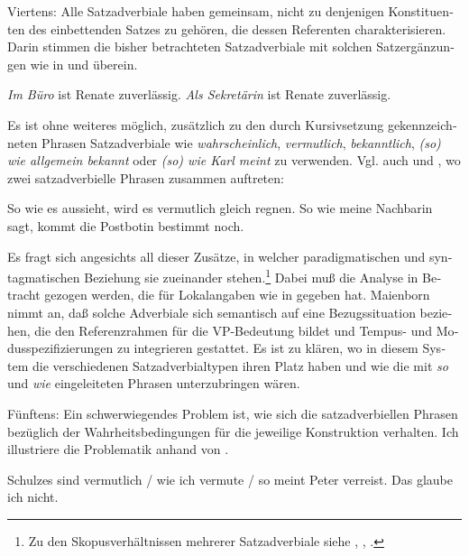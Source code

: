 \documentclass[output=paper, colorlinks, citecolor=brown, booklanguage=german]{langscibook}
\begin{document}
\begin{otherlanguage}{german}
Viertens: Alle Satzadverbiale haben gemeinsam, nicht zu denjenigen Konstituenten des einbettenden Satzes zu gehören, die dessen Referenten charakterisieren. Darin stimmen die bisher betrachteten Satzadverbiale mit solchen Satzergänzungen wie in  und  überein.

\ea \label{ex:zi97:64} %
\textit{Im Büro} ist Renate zuverlässig.
\ex \label{ex:zi97:65} %
\textit{Als Sekretärin} ist Renate zuverlässig.
\z

\noindent Es ist ohne weiteres möglich, zusätzlich zu den durch Kursivsetzung %
gekennzeichneten Phrasen Satzadverbiale wie \textit{wahrscheinlich}, \textit{vermutlich}, \textit{bekanntlich}, \textit{(so) wie allgemein bekannt} oder \textit{(so) wie Karl meint} zu verwenden. Vgl. auch  und , wo zwei satzadverbielle Phrasen zusammen auftreten:

\ea\label{ex:zi97::66} So wie es aussieht, wird es vermutlich gleich regnen.
\ex\label{ex:zi97::67} So wie meine Nachbarin sagt, kommt die Postbotin bestimmt noch.
\z 

\noindent Es fragt sich angesichts all dieser Zusätze, in welcher paradigmatischen und syntagmatischen Beziehung sie zueinander stehen.\footnote{Zu den Skopusverhältnissen mehrerer Satzadverbiale siehe \citet{bartsch1972adverbialsemantik}, \citet{lang1979zum-status-der-satzadverbiale, lang1983einstellungsausdrucke}, \citet{hetland1992satzadverbienimfokus}.} Dabei muß die Analyse in Betracht gezogen werden, die \citet{maienborn1996lokalesatzadverbiale,maienborn1996situation} für Lokalangaben wie in  gegeben hat. Maienborn nimmt an, daß solche Adverbiale sich semantisch auf eine Bezugssituation beziehen, die den Referenzrahmen für die VP-Bedeutung bildet und Tempus- und Modusspezifizierungen zu integrieren gestattet. Es ist zu klären, wo in diesem System die verschiedenen Satzadverbialtypen ihren Platz haben und wie die mit \textit{so} und \textit{wie} eingeleiteten Phrasen unterzubringen wären.

Fünftens: Ein schwerwiegendes Problem ist, wie sich die satzadverbiellen Phrasen bezüglich der Wahrheitsbedingungen für die jeweilige Konstruktion verhalten. Ich illustriere die Problematik anhand von .

\ea \label{ex:zi97:68} 
   \ea \label{ex:zi97:68a} Schulzes sind vermutlich / wie ich vermute / so meint Peter verreist.
   \ex \label{ex:zi97:68b} Das glaube ich nicht.
   \z
\z


\end{otherlanguage}
\end{document}
